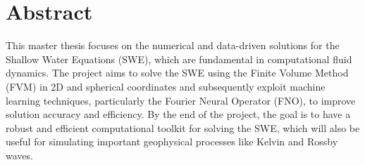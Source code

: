 \section*{Abstract}

    This master thesis focuses on the numerical and data-driven solutions for the Shallow Water Equations (SWE), which are fundamental in computational fluid dynamics. The project aims to solve the SWE using the Finite Volume Method (FVM) in 2D and spherical coordinates and subsequently exploit machine learning techniques, particularly the Fourier Neural Operator (FNO), to improve solution accuracy and efficiency. By the end of the project, the goal is to have a robust and efficient computational toolkit for solving the SWE, which will also be useful for simulating important geophysical processes like Kelvin and Rossby waves. 


